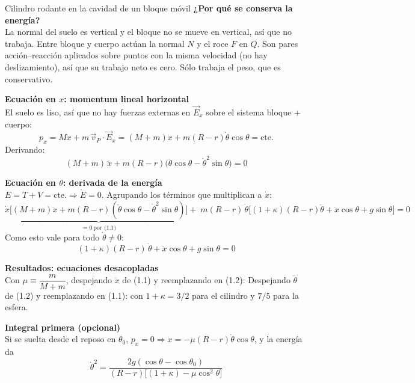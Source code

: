 \begin{solucion}{Cilindro rodante en la cavidad de un bloque móvil}
\textbf{¿Por qué se conserva la energía?}\\
La normal del suelo es vertical y el bloque no se mueve en vertical, así que no trabaja. Entre bloque y cuerpo actúan la normal $N$ y el roce $F$ en $Q$. Son pares acción--reacción aplicados sobre puntos con la misma velocidad (no hay deslizamiento), así que su trabajo neto es cero. Sólo trabaja el peso, que es conservativo.
 
 
\textbf{Ecuación en $x$: momentum lineal horizontal}\\
El suelo es liso, así que no hay fuerzas externas en $\vec{E}_x$ sobre el sistema bloque $+$ cuerpo:
$$p_x = M\dot x + m\,\vec{v}_P\cdot\vec{E}_x = (M+m)\dot x + m(R-r)\dot\theta\cos\theta = \text{cte.}$$
Derivando:
\begin{equation*}
(M+m)\,\ddot x + m(R-r)\big(\ddot\theta\cos\theta - \dot\theta^2\sin\theta\big) = 0 \tag{1.1}
\end{equation*}
 
\textbf{Ecuación en $\theta$: derivada de la energía}\\
$E=T+V=\text{cte.}\Rightarrow \dot E = 0$. Agrupando los términos que multiplican a $\dot x$:
\[
\dot x\underbrace{\Big[(M+m)\ddot x + m(R-r)(\ddot\theta\cos\theta-\dot\theta^2\sin\theta)\Big]}_{=0\ \text{por (1.1)}}
+\; m(R-r)\,\dot\theta\Big[(1+\kappa)(R-r)\ddot\theta + \ddot x\cos\theta + g\sin\theta\Big] = 0
\]
Como esto vale para todo $\dot\theta\neq 0$:
\begin{equation*}
(1+\kappa)(R-r)\,\ddot\theta + \ddot x\cos\theta + g\sin\theta = 0 \tag{1.2}
\end{equation*}
 
\textbf{Resultados: ecuaciones desacopladas}\\
Con $\mu \equiv \dfrac{m}{M+m}$, despejando $\ddot x$ de (1.1) y reemplazando en (1.2):
Despejando $\ddot\theta$ de (1.2) y reemplazando en (1.1):
con $1+\kappa = 3/2$ para el cilindro y $7/5$ para la esfera.
 
\textbf{Integral primera (opcional)}\\
Si se suelta desde el reposo en $\theta_0$, $p_x=0\Rightarrow \dot x = -\mu(R-r)\dot\theta\cos\theta$, y la energía da
$$\dot\theta^2 = \frac{2g(\cos\theta-\cos\theta_0)}{(R-r)\big[(1+\kappa)-\mu\cos^2\theta\big]}$$
 

\end{solucion}
